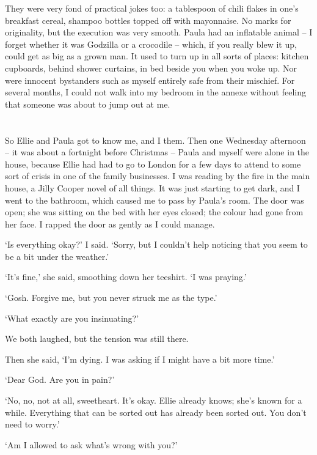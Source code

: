 They were very fond of practical jokes too: a tablespoon of chili flakes in one's breakfast cereal, shampoo bottles topped off with mayonnaise. No marks for originality, but the execution was very smooth. Paula had an inflatable animal -- I forget whether it was Godzilla or a crocodile -- which, if you really blew it up, could get as big as a grown man. It used to turn up in all sorts of places: kitchen cupboards, behind shower curtains, in bed beside you when you woke up. Nor were innocent bystanders such as myself entirely safe from their mischief. For several months, I could not walk into my bedroom in the annexe without feeling that someone was about to jump out at me.

\section{}

So Ellie and Paula got to know me, and I them. Then one Wednesday afternoon -- it was about a fortnight before Christmas -- Paula and myself were alone in the house, because Ellie had had to go to London for a few days to attend to some sort of crisis in one of the family businesses. I was reading by the fire in the main house, a Jilly Cooper novel of all things. It was just starting to get dark, and I went to the bathroom, which caused me to pass by Paula's room. The door was open; she was sitting on the bed with her eyes closed; the colour had gone from her face. I rapped the door as gently as I could manage.

`Is everything okay?' I said. `Sorry, but I couldn't help noticing that you seem to be a bit under the weather.'

`It's fine,' she said, smoothing down her teeshirt. `I was praying.'

`Gosh. Forgive me, but you never struck me as the type.'

`What exactly are you insinuating?'

We both laughed, but the tension was still there.

Then she said, `I'm dying. I was asking if I might have a bit more time.'

`Dear God. Are you in pain?'

`No, no, not at all, sweetheart. It's okay. Ellie already knows; she's known for a while. Everything that can be sorted out has already been sorted out. You don't need to worry.'

`Am I allowed to ask what's wrong with you?'


